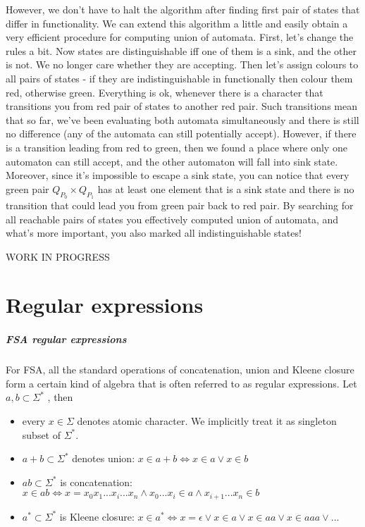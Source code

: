 \documentclass[12pt]{article}
\begin{document}
However, we don't have to halt the algorithm after finding first pair of states that differ in functionality.  We can extend this algorithm a little and easily obtain a very efficient procedure for computing union of automata. First, let's change the rules a bit. Now states are distinguishable iff one of them is a sink, and the other is not. We no longer care whether they are accepting. Then let's assign colours to all pairs of states - if they are indistinguishable in functionally then colour them red, otherwise green. Everything is ok, whenever there is a character that transitions you from red pair of states to another red pair. Such transitions mean that so far, we've been evaluating both automata simultaneously and there is still no difference (any of the automata can still potentially accept). However, if there is a transition leading from red to green, then we found a place where only one automaton can still accept, and the other automaton will fall into sink state. Moreover, since it's impossible to escape a sink state, you can notice that every green pair $Q_{P_0} \times Q_{P_1}$ has at least one  element that is a sink state and there is no transition that could lead you from green pair back to red pair. By searching for all reachable pairs of states you effectively computed union of automata, and what's more important, you also marked all indistinguishable states! 


WORK IN PROGRESS


\section{Regular expressions}






\subparagraph{FSA regular expressions}
For FSA, all the standard operations of concatenation, union and Kleene closure form a certain kind of algebra that is often referred to as regular expressions. 
Let $a,b \subset  \Sigma^*$ , then
\begin{itemize}
	\item every $x \in \Sigma$ denotes atomic character. We implicitly treat it as singleton subset of $\Sigma^*$.
	\item $a+b\subset \Sigma^*$ denotes union: $x\in a+b \iff x\in a \vee x\in b$
	\item $ab\subset \Sigma^*$ is concatenation: $x \in ab \iff x=x_0x_1...x_i...x_n \wedge x_0...x_i \in a \wedge x_{i+1}...x_n \in b$
	\item $a^* \subset \Sigma^*$ is Kleene closure: $x\in a^* \iff x=\epsilon \vee x\in a \vee x\in aa \vee x \in aaa \vee ...$
\end{itemize}  
\end{document}
